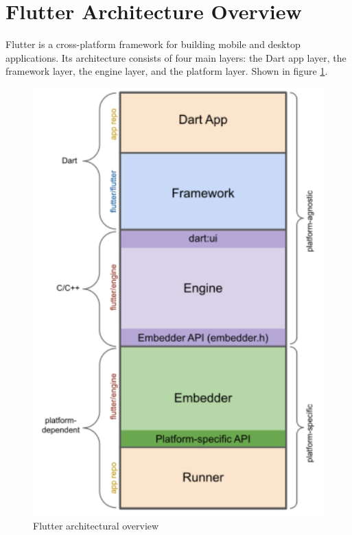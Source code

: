 \documentclass[conference]{IEEEtran}
\begin{document}
\section{Flutter Architecture Overview}

Flutter is a cross-platform framework for building mobile and desktop applications. Its architecture consists of four main layers: the Dart app layer, the framework layer, the engine layer, and the platform layer. Shown in figure \ref{fig:flutter_tech_stack}.

\begin{figure}[ht]
	\centerline{\includegraphics[width=\linewidth]{figures/app-anatomy}}
	\caption{Flutter architectural overview \cite{b1.1}}
	\label{fig:flutter_tech_stack}
\end{figure}
\end{document}

